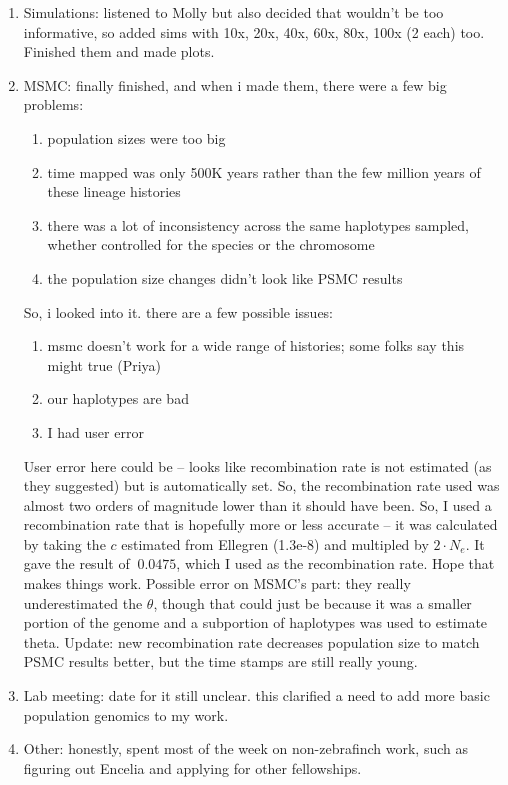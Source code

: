 \documentclass[idxtotoc,hyperref,openany,oneside]{labbook} %
\begin{document}
\begin{enumerate}
\item Simulations: listened to Molly but also decided that wouldn't be too informative, so added sims with 10x, 20x, 40x, 60x, 80x, 100x (2 each) too. Finished them and made plots.
\item MSMC: finally finished, and when i made them, there were a few big problems:
\begin{enumerate}
\item population sizes were too big
\item time mapped was only 500K years rather than the few million years of these lineage histories
\item there was a lot of inconsistency across the same haplotypes sampled, whether controlled for the species or the chromosome
\item the population size changes didn't look like PSMC results
\end{enumerate}
So, i looked into it. there are a few possible issues:
\begin{enumerate}
\item msmc doesn't work for a wide range of histories; some folks say this might true (Priya)
\item our haplotypes are bad
\item I had user error
\end{enumerate}
User error here could be -- looks like recombination rate is not estimated (as they suggested) but is automatically set. So, the recombination rate used was almost two orders of magnitude lower than it should have been. So, I used a recombination rate that is hopefully more or less accurate -- it was calculated by taking the $c$ estimated from Ellegren (1.3e-8) and multipled by $2 \cdot N_e$. It gave the result of $~0.0475$, which I used as the recombination rate. Hope that makes things work. Possible error on MSMC's part: they really underestimated the $\theta$, though that could just be because it was a smaller portion of the genome and a subportion of haplotypes was used to estimate theta. Update: new recombination rate decreases population size to match PSMC results better, but the time stamps are still really young. 
\item Lab meeting: date for it still unclear. this clarified a need to add more basic population genomics to my work.
\item Other: honestly, spent most of the week on non-zebrafinch work, such as figuring out Encelia and applying for other fellowships.
\end{enumerate}
\end{document}
